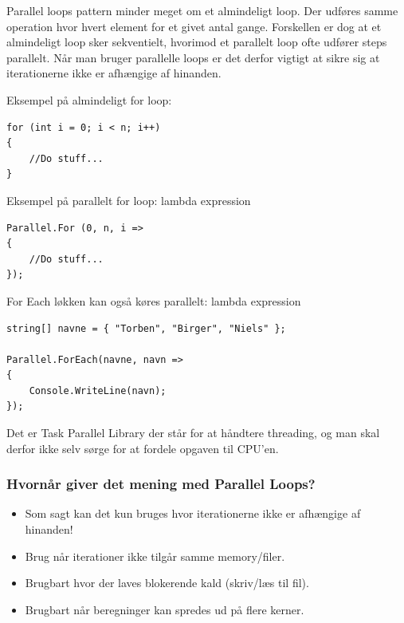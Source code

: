 Parallel loops pattern minder meget om et almindeligt loop. Der udføres samme operation hvor hvert element for et givet antal gange. Forskellen er dog at et almindeligt loop sker sekventielt, hvorimod et parallelt loop ofte udfører steps parallelt. Når man bruger parallelle loops er det derfor vigtigt at sikre sig at iterationerne ikke er afhængige af hinanden.

Eksempel på almindeligt for loop:

\begin{lstlisting}[caption=Normal for loop, label=code:normalLoop]
for (int i = 0; i < n; i++)
{
	//Do stuff...
}
\end{lstlisting}

Eksempel på parallelt for loop: lambda expression

\begin{lstlisting}[caption=Parallel for loop,  label=code:paraLoop,
morekeywords={Parallel, For}]
Parallel.For (0, n, i =>
{
	//Do stuff...
});
\end{lstlisting}

For Each løkken kan også køres parallelt: lambda expression

\begin{lstlisting}[caption=Parallelt for each loop, label=paraForEach,morekeywords={string,Parallel, ForEach, WriteLine}]
string[] navne = { "Torben", "Birger", "Niels" };

Parallel.ForEach(navne, navn =>
{
	Console.WriteLine(navn);
});
\end{lstlisting}

Det er Task Parallel Library der står for at håndtere threading, og man skal derfor ikke selv sørge for at fordele opgaven til CPU'en. 

\subsubsection{Hvornår giver det mening med Parallel Loops?}
\begin{itemize}
	\item Som sagt kan det kun bruges hvor iterationerne ikke er afhængige af hinanden!
	\item Brug når iterationer ikke tilgår samme memory/filer.
	\item Brugbart hvor der laves blokerende kald (skriv/læs til fil).
	\item Brugbart når beregninger kan spredes ud på flere kerner.
\end{itemize}

